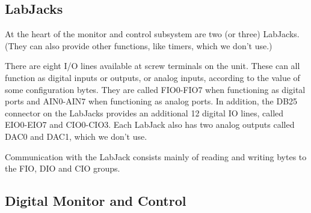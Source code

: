 \documentclass[letterpaper,11pt]{book}
\begin{document}
\subsection{LabJacks}

At the heart of the monitor and control subsystem are two (or three) 
LabJacks.  (They can also provide other functions, like timers,
which we don't use.)

There are eight I/O lines available at screw terminals on the unit. These can
all function as digital inputs or outputs, or analog inputs, according to the
value of some configuration bytes.  They are called FIO0-FIO7 when functioning
as digital ports and AIN0-AIN7 when functioning as analog ports.  In addition,
the DB25 connector on the LabJacks provides an additional 12 digital IO lines,
called EIO0-EIO7 and CIO0-CIO3.  Each LabJack also has two analog
outputs called DAC0 and DAC1, which we don't use.

Communication with the LabJack consists mainly of reading and writing bytes to
the FIO, DIO and CIO groups.


\subsection{Digital Monitor and Control}
\end{document}
